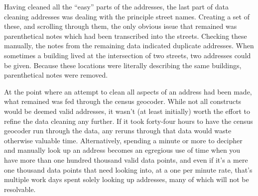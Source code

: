 Having cleaned all the “easy” parts of the addresses, the last part of data cleaning addresses was dealing with the principle street names.  Creating a set of these, and scrolling through them, the only obvious issue that remained was parenthetical notes which had been transcribed into the streets.  Checking these manually, the notes from the remaining data indicated duplicate addresses.  When sometimes a building lived at the intersection of two streets, two addresses could be given.  Because these locations were literally describing the same buildings, parenthetical notes were removed.

\par At the point where an attempt to clean all aspects of an address had been made, what remained was fed through the census geocoder.  While not all constructs would be deemed valid addresses, it wasn’t (at least initially) worth the effort to refine the data cleaning any further.  If it took forty-four hours to have the census geocoder run through the data, any reruns through that data would waste otherwise valuable time.  Alternatively, spending a minute or more to decipher and manually look up an address becomes an egregious use of time when you have more than one hundred thousand valid data points, and even if it’s a mere one thousand data points that need looking into, at a one per minute rate, that’s multiple work days spent solely looking up addresses, many of which will not be resolvable.